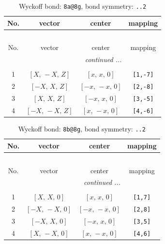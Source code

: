 \documentclass[fleqn,8pt]{jsarticle}
\begin{document}
\begin{longtable}{cccc}
\caption{Wyckoff bond: {\tt 8a@8g}, bond symmetry: {\tt ..2}}
 \\
 \hline \hline
No. & vector & center & mapping \\ \hline \endfirsthead

\multicolumn{3}{l}{\tablename\ \thetable{}} \\
 \hline \hline
No. & vector & center & mapping \\ \hline \endhead

 \hline \hline
\multicolumn{3}{r}{\footnotesize\it continued ...} \\ \endfoot

 \hline \hline
\multicolumn{3}{r}{} \\ \endlastfoot

1 & $\left[ X,\, - X,\, Z \right]$ & $\left[ x,\, x,\, 0 \right]$ & {\tt [1,-7]} \\ \hline
2 & $\left[ - X,\, X,\, Z \right]$ & $\left[ - x,\, - x,\, 0 \right]$ & {\tt [2,-8]} \\ \hline
3 & $\left[ X,\, X,\, Z \right]$ & $\left[ - x,\, x,\, 0 \right]$ & {\tt [3,-5]} \\ \hline
4 & $\left[ - X,\, - X,\, Z \right]$ & $\left[ x,\, - x,\, 0 \right]$ & {\tt [4,-6]} \\
\end{longtable}
\renewcommand{\arraystretch}{1.2}
\begin{longtable}{cccc}
\caption{Wyckoff bond: {\tt 8b@8g}, bond symmetry: {\tt ..2}}
 \\
 \hline \hline
No. & vector & center & mapping \\ \hline \endfirsthead

\multicolumn{3}{l}{\tablename\ \thetable{}} \\
 \hline \hline
No. & vector & center & mapping \\ \hline \endhead

 \hline \hline
\multicolumn{3}{r}{\footnotesize\it continued ...} \\ \endfoot

 \hline \hline
\multicolumn{3}{r}{} \\ \endlastfoot

1 & $\left[ X,\, X,\, 0 \right]$ & $\left[ x,\, x,\, 0 \right]$ & {\tt [1,7]} \\ \hline
2 & $\left[ - X,\, - X,\, 0 \right]$ & $\left[ - x,\, - x,\, 0 \right]$ & {\tt [2,8]} \\ \hline
3 & $\left[ - X,\, X,\, 0 \right]$ & $\left[ - x,\, x,\, 0 \right]$ & {\tt [3,5]} \\ \hline
4 & $\left[ X,\, - X,\, 0 \right]$ & $\left[ x,\, - x,\, 0 \right]$ & {\tt [4,6]} \\
\end{longtable}
\end{document}
